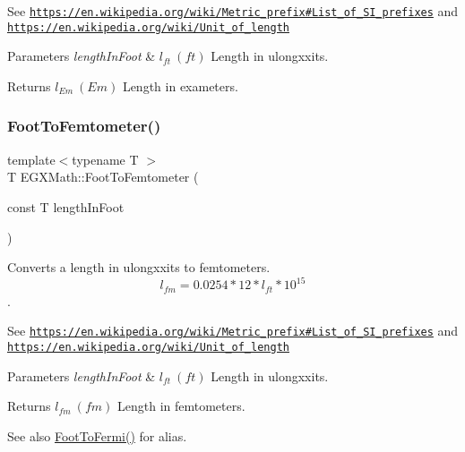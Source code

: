 See \href{https://en.wikipedia.org/wiki/Metric_prefix#List_of_SI_prefixes}{\tt https\+://en.\+wikipedia.\+org/wiki/\+Metric\+\_\+prefix\#\+List\+\_\+of\+\_\+\+S\+I\+\_\+prefixes} and \href{https://en.wikipedia.org/wiki/Unit_of_length}{\tt https\+://en.\+wikipedia.\+org/wiki/\+Unit\+\_\+of\+\_\+length} 
\begin{DoxyParams}{Parameters}
{\em length\+In\+Foot} & $ l_{ft}\ (ft)$ Length in ulongxxits. \\
\hline
\end{DoxyParams}
\begin{DoxyReturn}{Returns}
$ l_{Em}\ (Em)$ Length in exameters. 
\end{DoxyReturn}
\mbox{\label{group___e_g_x_math-_conversions-_length_conversions-_imperial-_foot-_s_i_gac178ec8356add4e77a27766831cb7247}} 
\subsubsection{\texorpdfstring{Foot\+To\+Femtometer()}{FootToFemtometer()}}
{\footnotesize\ttfamily template$<$typename T $>$ \\
T E\+G\+X\+Math\+::\+Foot\+To\+Femtometer (\begin{DoxyParamCaption}\item[{const T}]{length\+In\+Foot }\end{DoxyParamCaption})}



Converts a length in ulongxxits to femtometers. \[ l_{fm}=0.0254 * 12 * l_{ft} * 10^{15} \]. 

See \href{https://en.wikipedia.org/wiki/Metric_prefix#List_of_SI_prefixes}{\tt https\+://en.\+wikipedia.\+org/wiki/\+Metric\+\_\+prefix\#\+List\+\_\+of\+\_\+\+S\+I\+\_\+prefixes} and \href{https://en.wikipedia.org/wiki/Unit_of_length}{\tt https\+://en.\+wikipedia.\+org/wiki/\+Unit\+\_\+of\+\_\+length} 
\begin{DoxyParams}{Parameters}
{\em length\+In\+Foot} & $ l_{ft}\ (ft)$ Length in ulongxxits. \\
\hline
\end{DoxyParams}
\begin{DoxyReturn}{Returns}
$ l_{fm}\ (fm)$ Length in femtometers. 
\end{DoxyReturn}
\begin{DoxySeeAlso}{See also}
\mbox{\hyperlink{group___e_g_x_math-_conversions-_length_conversions-_imperial-_foot-_non-_s_i_gac61392c75e58e12f6a8a99aa765f22a0}{Foot\+To\+Fermi()}} for alias. 
\end{DoxySeeAlso}
\mbox{\label{group___e_g_x_math-_conversions-_length_conversions-_imperial-_foot-_s_i_ga396dd6b0ee16dd5c9a11688377a85c52}} 
